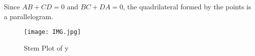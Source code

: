 \documentclass[journal,12pt,onecolumn]{IEEEtran}
\theoremstyle{remark}
\begin{document}
Since $AB + CD = 0 $ and $ BC+ DA = 0 $, the quadrilateral formed by the points is a parallelogram.

\begin{figure}[h!]
   \centering
   \texttt{[image: IMG.jpg]}
   \caption{Stem Plot of y}
     \label{stemplot}
\end{figure}
\end{document}
